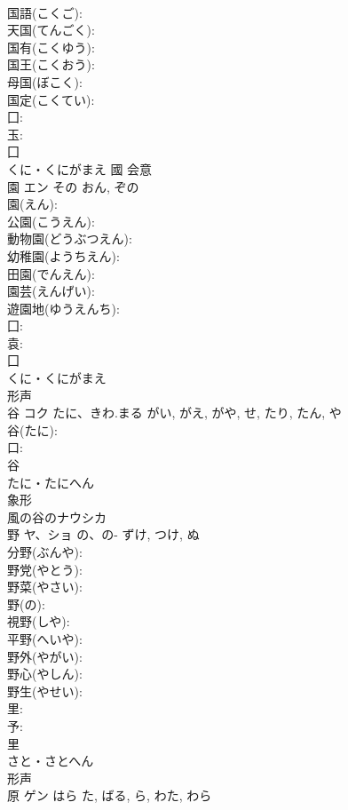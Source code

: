 \documentclass[8pt]{extreport}
\begin{document}
\begin{CJK}{UTF8}{min}
\\	国語(こくご): 
\\	天国(てんごく): 
\\	国有(こくゆう): 
\\	国王(こくおう): 
\\	母国(ぼこく): 
\\	国定(こくてい): 
\\	囗: 
\\	玉: 
\\	囗	
\\	くに・くにがまえ	國	会意 
\\	園	エン	その	おん, ぞの	
\\	園(えん): 
\\	公園(こうえん): 
\\	動物園(どうぶつえん): 
\\	幼稚園(ようちえん): 
\\	田園(でんえん): 
\\	園芸(えんげい): 
\\	遊園地(ゆうえんち): 
\\	囗: 
\\	袁: 
\\	囗	
\\	くに・くにがまえ	
\\	形声 
\\	谷	コク	たに、きわ.まる	がい, がえ, がや, せ, たり, たん, や	
\\	谷(たに): 
\\	口: 
\\	谷	
\\	たに・たにへん	
\\	象形 
\\	風の谷のナウシカ 
\\	野	ヤ、ショ	の、の-	ずけ, つけ, ぬ	
\\	分野(ぶんや): 
\\	野党(やとう): 
\\	野菜(やさい): 
\\	野(の): 
\\	視野(しや): 
\\	平野(へいや): 
\\	野外(やがい): 
\\	野心(やしん): 
\\	野生(やせい): 
\\	里: 
\\	予: 
\\	里	
\\	さと・さとへん	
\\	形声 
\\	原	ゲン	はら	た, ばる, ら, わた, わら	

\end{CJK}
\end{document}
